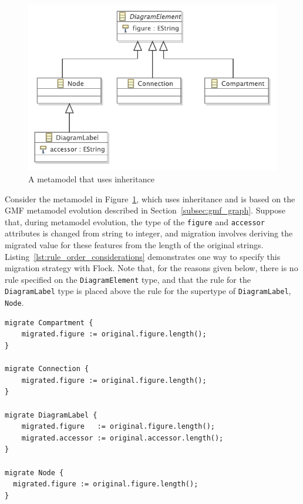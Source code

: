 \begin{figure}[htbp]
  \centering
  \includegraphics[scale=0.75]{6.Evaluation/images/subtyping.pdf}
  \caption{A metamodel that uses inheritance}
  \label{fig:inheritance}
\end{figure}

Consider the metamodel in Figure~\ref{fig:inheritance}, which uses inheritance and is based on the GMF metamodel evolution described in Section~\ref{subsec:gmf_graph}. Suppose that, during metamodel evolution, the type of the \texttt{fi\-gu\-re} and \texttt{ac\-ce\-ss\-or} attributes is changed from string to integer, and migration involves deriving the migrated value for these features from the length of the original strings. Listing~\ref{lst:rule_order_considerations} demonstrates one way to specify this migration strategy with Flock. Note that, for the reasons given below, there is no rule specified on the \texttt{Di\-ag\-r\-amEl\-em\-e\-nt} type, and that the rule for the \texttt{Di\-ag\-r\-amLa\-b\-el} type is placed above the rule for the supertype of \texttt{Di\-ag\-r\-amLa\-b\-el}, \texttt{No\-de}.

\begin{lstlisting}[float=tbp, caption={[A migration strategy for the evolution in Figure~\ref{fig:inheritance}]A migration strategy for the metamodel evolution described in Figure~\ref{fig:inheritance}}, label=lst:rule_order_considerations, language=Flock, tabsize=2]
migrate Compartment {
	migrated.figure := original.figure.length();
}

migrate Connection {
	migrated.figure := original.figure.length();
}

migrate DiagramLabel {
	migrated.figure   := original.figure.length();
	migrated.accessor := original.accessor.length();
}

migrate Node {
  migrated.figure := original.figure.length();
}
\end{lstlisting}

